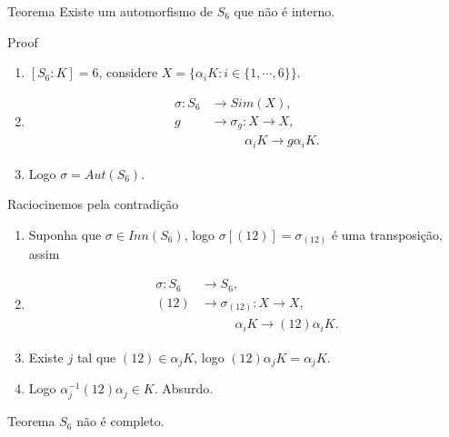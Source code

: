 \begin{frame}{}
  \begin{block}{Teorema}
    Existe um automorfismo de $S_6$ que não é interno.     
  \end{block}
  \begin{block}{Proof}
    \begin{enumerate}
      \item $[S_6:K]=6$, considere $X=\{\alpha_i K:i\in\{1,\cdots,6\}\}$.
      \item
        \begin{align*}
          \sigma:S_6&\to Sim(X),\\
                   g&\to \sigma_g:X\to X,\\
                    &\phantom{\to\sigma_g}\,\alpha_i K\to g\alpha_i K.
        \end{align*}
      \item Logo $\sigma=Aut(S_6)$.
    \end{enumerate}
  \end{block}
\end{frame}
\begin{frame}
  \begin{block}{}
    Raciocinemos pela contradição
    \begin{enumerate}
      \item Suponha que $\sigma\in Inn(S_6)$, logo $\sigma[(12)]=\sigma_{(12)}$ é uma transposição, assim
      \item
        \begin{align*}
          \sigma:S_6&\to S_6,\\
                   (12)&\to \sigma_{(12)}:X\to X,\\
                    &\phantom{\to\sigma_g}\,\alpha_i K\to (12)\alpha_i K.
        \end{align*}
      \item Existe $j$ tal que $(12)\in \alpha_{j}K$, logo $(12)\alpha_jK=\alpha_j K$.
      \item Logo $\alpha_j^{-1}(12)\alpha_j\in K$. Absurdo.
    \end{enumerate}
  \end{block}
  \begin{block}{Teorema}
    $S_6$ não é completo.        
  \end{block}
\end{frame}
